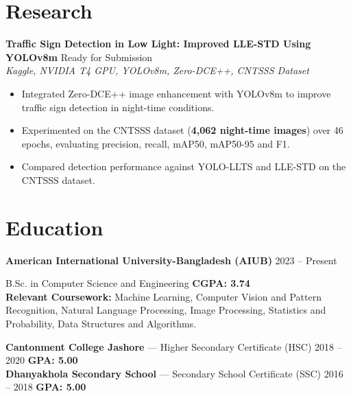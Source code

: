 \documentclass[10pt,a4paper]{article}
\newcommand{\resumeEntry}[3]{%
  \noindent\textbf{#1} \hfill #2\\
  {\textit{#3}}
}
\newenvironment{keep}
  {\par\noindent\begin{minipage}{\linewidth}\setlength{\parskip}{0pt}}
  {\end{minipage}\par\vspace{5pt}}
\begin{document}
\section*{Research}
\begin{keep}
\resumeEntry{Traffic Sign Detection in Low Light: Improved LLE-STD Using YOLOv8m}{Ready for Submission}{Kaggle, NVIDIA T4 GPU, YOLOv8m, Zero-DCE++, CNTSSS Dataset}
\begin{itemize}
    \item Integrated Zero-DCE++ image enhancement with YOLOv8m to improve traffic sign detection in night-time conditions.
    \item Experimented on the CNTSSS dataset (\textbf{4,062 night-time images}) over 46 epochs, evaluating precision, recall, mAP50, mAP50-95 and F1.
    \item Compared detection performance against YOLO-LLTS and LLE-STD on the CNTSSS dataset.
\end{itemize}
\end{keep}

\section*{Education}
\resumeEntry{American International University-Bangladesh (AIUB)}{2023 -- Present}{}
B.Sc. in Computer Science and Engineering \hfill \textbf{CGPA: 3.74}\\
\textbf{Relevant Coursework:} Machine Learning, Computer Vision and Pattern Recognition, Natural Language Processing, Image Processing, Statistics and Probability, Data Structures and Algorithms.

\vspace{3pt}
\textbf{Cantonment College Jashore} --- Higher Secondary Certificate (HSC) \hfill 2018 -- 2020 \quad \textbf{GPA: 5.00}\\
\textbf{Dhanyakhola Secondary School} --- Secondary School Certificate (SSC) \hfill 2016 -- 2018 \quad \textbf{GPA: 5.00}

\end{document}
